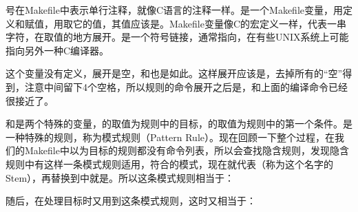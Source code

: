 \BookCode{\#}号在Makefile中表示单行注释，就像C语言的\BookCode{/\BookSplit{}/\BookSplit{}}注释一样。是一个Makefile变量，用定义和赋值，用取它的值，其值应该是。Makefile变量像C的宏定义一样，代表一串字符，在取值的地方展开。是一个符号链接，通常指向，在有些UNIX系统上可能指向另外一种C编译器。




这个变量没有定义，展开是空，和也是如此。这样展开应该是，去掉所有的“空”得到，注意中间留下4个空格，所以规则的命令展开之后是，和上面的编译命令已经很接近了。



和\BookCode{\$\textless{}}是两个特殊的变量，的取值为规则中的目标，\BookCode{\$\textless{}}的取值为规则中的第一个条件。是一种特殊的规则，称为模式规则（Pattern Rule）。现在回顾一下整个过程，在我们的Makefile中以为目标的规则都没有命令列表，所以会查找隐含规则，发现隐含规则中有这样一条模式规则适用，符合的模式，现在\BookCode{\%}就代表（称为这个名字的Stem），再替换到中就是。所以这条模式规则相当于：




随后，在处理目标时又用到这条模式规则，这时又相当于：




